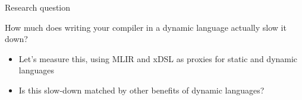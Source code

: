 \documentclass[10pt,aspectratio=169]{beamer}
\begin{document}
\begin{frame}{Research question}
    \begin{center}
        \huge How much does writing your compiler in a dynamic language actually slow it down? \\
    \end{center}
    \vspace{1.5em}

    \begin{itemize}
        \item Let's measure this, using MLIR and xDSL as proxies for static and dynamic languages
        \item Is this slow-down matched by other benefits of dynamic languages?
    \end{itemize}
\end{frame}
\end{document}
